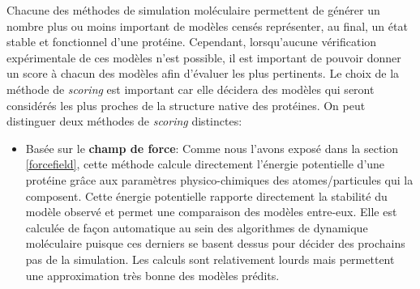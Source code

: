 Chacune des méthodes de simulation moléculaire permettent de générer un nombre plus ou moins important de modèles censés représenter, au final, un état stable et fonctionnel d'une protéine. Cependant, lorsqu'aucune vérification expérimentale de ces modèles n'est possible, il est important de pouvoir donner un score à chacun des modèles afin d'évaluer les plus pertinents. Le choix de la méthode de \textit{scoring} est important car elle décidera des modèles qui seront considérés les plus proches de la structure native des protéines. On peut distinguer deux méthodes de \textit{scoring} distinctes:

\begin{itemize}
	\item Basée sur le \textbf{champ de force}: Comme nous l'avons exposé dans la section \ref{forcefield}, cette méthode calcule directement l'énergie potentielle d'une protéine grâce aux paramètres physico-chimiques des atomes/particules qui la composent. Cette énergie potentielle rapporte directement la stabilité du modèle observé et permet une comparaison des modèles entre-eux. Elle est calculée de façon automatique au sein des algorithmes de dynamique moléculaire puisque ces derniers se basent dessus pour décider des prochains pas de la simulation. Les calculs sont relativement lourds mais permettent une approximation très bonne des modèles prédits.

\end{itemize}
